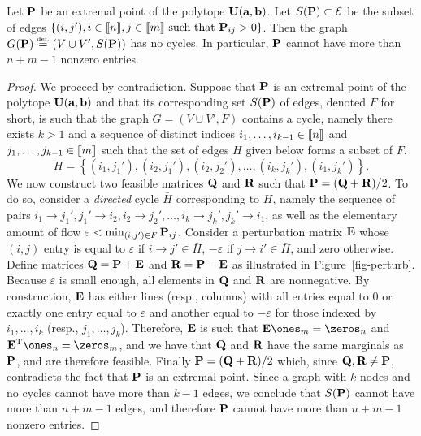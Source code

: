 \begin{prop}\label{prop-extremal}
Let $\P$ be an extremal point of the polytope $\CouplingsD(\a,\b)$. Let $S(\P)\subset \alledges$ be the subset of edges $\{(i,j'), i\in\range{n}, j\in\range{m} \text{ such that } \P_{ij}>0\}$. Then the graph $G(\P)\eqdef (V\cup V',S(\P))$ has no cycles. In particular, $\P$ cannot have more than $n+m-1$ nonzero entries.
 \end{prop}
\begin{proof}
We proceed by contradiction. Suppose that $\P$ is an extremal point of the polytope $\CouplingsD(\a,\b)$ and that its corresponding set $S(\P)$ of edges, denoted $F$ for short, is such that the graph $G=(V\cup V',F)$ contains a cycle, namely there exists $k>1$ and a sequence of distinct indices $i_1,\dots,i_{k-1}\in\range{n}$ and $j_1,\dots,j_{k-1}\in\range{m}$ such that the set of edges $H$ given below forms a subset of $F$. $$H=\left\{(i_1,j_1'), (i_2,j_1'), (i_2,j_2'),\dots,(i_k,j_k'),(i_1,j_k')\right\}.$$ 
	We now construct two feasible matrices $\Q$ and $\RRd$ such that $\P=(\Q+\RRd)/2$. To do so, consider a \emph{directed} cycle $\bar{H}$ corresponding to $H$, namely the sequence of pairs $i_1\rightarrow j_1', j_1' \rightarrow i_2, i_2 \rightarrow j_2',\dots, i_k \rightarrow j_k' , j_k' \rightarrow i_1$, as well as the elementary amount of flow $\varepsilon < \min_{(i,j')\in F}\P_{ij}$.
	Consider a perturbation matrix $\E$ whose $(i,j)$ entry is equal to $\varepsilon$ if $i\rightarrow j' \in \bar{H}$, $-\varepsilon$ if $ j\rightarrow i'\in \bar{H}$, and zero otherwise. Define matrices $\Q=\P+\E$ and $\RRd=\P-\E$ as illustrated in Figure~\ref{fig-perturb}. Because $\varepsilon$ is small enough, all elements in $\Q$ and $\RRd$ are nonnegative. By construction, $\E$ has either lines (resp., columns) with all entries equal to $0$ or exactly one entry equal to $\varepsilon$ and another equal to $-\varepsilon$ for those indexed by $i_1,\dots,i_k$ (resp., $j_1,\dots,j_k$). Therefore, $\E$ is such that $\E\ones_{m}=\zeros_{n}$ and $\transp{\E}\ones_{n}=\zeros_{m}$, and we have that $\Q$ and $\RRd$ have the same marginals as $\P$, and are therefore feasible. Finally $\P=(\Q+\RRd)/2$ which, since $\Q,\RRd\ne \P$, contradicts the fact that $\P$ is an extremal point. Since a graph with $k$ nodes and no cycles cannot have more than $k-1$ edges, we conclude that $S(\P)$ cannot have more than $n+m-1$ edges, and therefore $\P$ cannot have more than $n+m-1$ nonzero entries. 
\end{proof}

